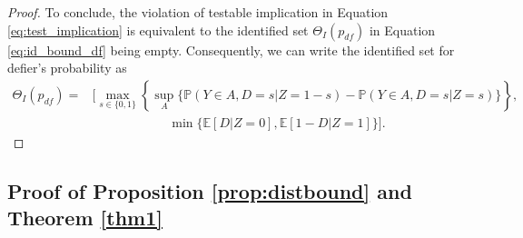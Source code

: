 \documentclass[12pt]{article}
\theoremstyle{plain}
\theoremstyle{definition}
\theoremstyle{remark}
\begin{document}
\begin{proof}
To conclude, the violation of testable implication in Equation \eqref{eq:test_implication} is equivalent to the identified set $\Theta_I(p_{df})$ in Equation \eqref{eq:id_bound_df} being empty. Consequently, we can write the identified set for defier's probability as
\begin{equation*}
    \begin{aligned}
        \Theta_{I}(p_{df}) = & \bigg[\max _{s \in\{0,1\}}\left\{\sup _A\{\mathbb{P}(Y \in A, D=s  \vert  Z=1-s)-\mathbb{P}(Y \in A, D=s  \vert  Z=s)\}\right\}, \\
        & \qquad \qquad \qquad \min \{\mathbb{E}[D  \vert  Z=0], \mathbb{E}[1-D  \vert  Z=1]\}\bigg].
    \end{aligned}
\end{equation*}
\end{proof}


\subsection{Proof of Proposition \ref{prop:distbound} and Theorem \ref{thm1}} \label{app:proof_prop2_thm1}
\end{document}
